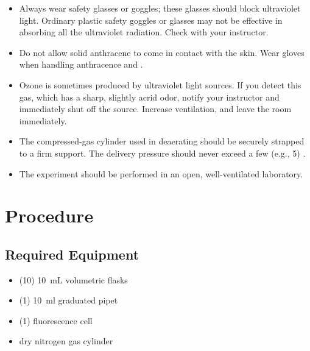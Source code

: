 \documentclass[nobib,nofonts,nols,nohyper]{tufte-handout}
\begin{document}
\begin{itemize}
	\item Always wear safety glasses or goggles; these glasses should block ultraviolet light. 
	Ordinary plastic safety goggles or glasses may not be effective in absorbing all the ultraviolet radiation. 
	Check with your instructor.
	\item Do not allow solid anthracene to come in contact with the skin. 
	Wear gloves when handling anthracence and .
	\item Ozone is sometimes produced by ultraviolet light sources. 
	If you detect this gas, which has a sharp, slightly acrid odor, notify your instructor and immediately shut off the source.
	Increase ventilation, and leave the room immediately.
	\item The compressed-gas cylinder used in deaerating should be securely strapped to a firm support.
	The delivery pressure should never exceed a few (e.g., 5) \unit{\psig}.
	\item The experiment should be performed in an open, well-ventilated laboratory.
\end{itemize}


\section{Procedure} %
\label{sec:procedure}

\subsection{Required Equipment} %
\label{sub:required_equipment}

\begin{itemize}
	\item (10) \qty{10}{\mL} volumetric flasks
	\item (1) \qty{10}{\ml} graduated pipet
	\item (1) fluorescence cell
	\item dry nitrogen gas cylinder
\end{itemize}

\end{document}
